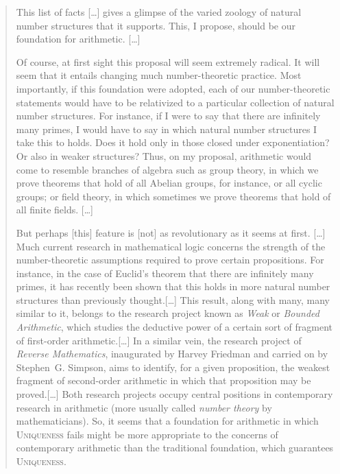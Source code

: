 \documentclass{bhamthesis}
\theoremstyle{definition}
\begin{document}
\begin{quotation}
 This list of facts [\ldots] gives a glimpse of the varied zoology
 of natural number structures that it supports.  This, I propose,
 should be our foundation for arithmetic.  [\ldots]

 Of course, at first sight this proposal will seem extremely
 radical. It will seem that it entails changing much
 number-theoretic practice.  Most importantly, if this foundation
 were adopted, each of our number-theoretic statements would have
 to be relativized to a particular collection of natural number
 structures.  For instance, if I were to say that there are
 infinitely many primes, I would have to say in which natural
 number structures I take this to holds.  Does it hold only in
 those closed under exponentiation?  Or also in weaker structures?
 Thus, on my proposal, arithmetic would come to resemble branches
 of algebra such as group theory, in which we prove theorems that
 hold of all Abelian groups, for instance, or all cyclic groups;
 or field theory, in which sometimes we prove theorems that hold
 of all finite fields.  [\ldots]

 But perhaps [this] feature is [not] as revolutionary as it seems
 at first.  [\ldots]  Much current research in mathematical logic
 concerns the strength of the number-theoretic assumptions
 required to prove certain propositions.  For instance, in the
 case of Euclid's theorem that there are infinitely many primes,
 it has recently been shown that this holds in more natural number
 structures than previously thought.[\ldots]  This result, along
 with many, many similar to it, belongs to the research project
 known as \emph{Weak} or \emph{Bounded Arithmetic}, which studies
 the deductive power of a certain sort of fragment of first-order
 arithmetic.[\ldots]  In a similar vein, the research project of
 \emph{Reverse Mathematics}, inaugurated by Harvey Friedman and
 carried on by Stephen~G. Simpson, aims to identify, for a given
 proposition, the weakest fragment of second-order arithmetic in
 which that proposition may be proved.[\ldots]  Both research
 projects occupy central positions in contemporary research in
 arithmetic (more usually called \emph{number theory} by
 mathematicians).  So, it seems that a foundation for arithmetic
 in which \textsc{Uniqueness} fails might be more appropriate to
 the concerns of contemporary arithmetic than the traditional
 foundation, which guarantees \textsc{Uniqueness}.


\end{quotation}
\end{document}
